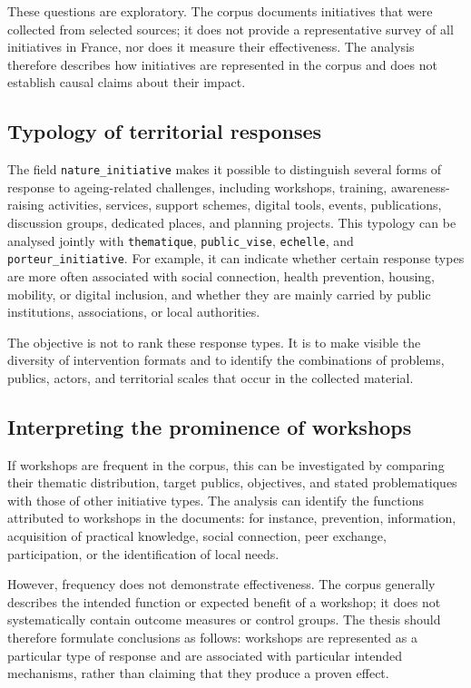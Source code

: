 These questions are exploratory. The corpus documents initiatives that were
collected from selected sources; it does not provide a representative survey of
all initiatives in France, nor does it measure their effectiveness. The analysis
therefore describes how initiatives are represented in the corpus and does not
establish causal claims about their impact.

\subsection{Typology of territorial responses}

The field \texttt{nature\_initiative} makes it possible to distinguish several
forms of response to ageing-related challenges, including workshops, training,
awareness-raising activities, services, support schemes, digital tools, events,
publications, discussion groups, dedicated places, and planning projects. This
typology can be analysed jointly with \texttt{thematique},
\texttt{public\_vise}, \texttt{echelle}, and \texttt{porteur\_initiative}.
For example, it can indicate whether certain response types are more often
associated with social connection, health prevention, housing, mobility, or
digital inclusion, and whether they are mainly carried by public institutions,
associations, or local authorities.

The objective is not to rank these response types. It is to make visible the
diversity of intervention formats and to identify the combinations of problems,
publics, actors, and territorial scales that occur in the collected material.

\subsection{Interpreting the prominence of workshops}

If workshops are frequent in the corpus, this can be investigated by comparing
their thematic distribution, target publics, objectives, and stated
problematiques with those of other initiative types. The analysis can identify
the functions attributed to workshops in the documents: for instance,
prevention, information, acquisition of practical knowledge, social connection,
peer exchange, participation, or the identification of local needs.

However, frequency does not demonstrate effectiveness. The corpus generally
describes the intended function or expected benefit of a workshop; it does not
systematically contain outcome measures or control groups. The thesis should
therefore formulate conclusions as follows: workshops are represented as a
particular type of response and are associated with particular intended
mechanisms, rather than claiming that they produce a proven effect.

